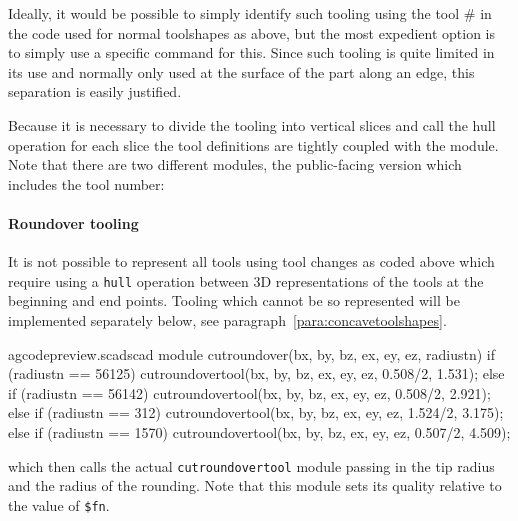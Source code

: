 \documentclass{ltxdoc}
\begin{document}
Ideally, it would be possible to simply identify such tooling using the tool \# in the code used for normal toolshapes as above, but the most expedient option is to simply use a specific command for this. Since such tooling is quite limited in its use and normally only used at the surface of the part along an edge, this separation is easily justified.

Because it is necessary to divide the tooling into vertical slices and call the hull operation for each slice the tool definitions are tightly coupled with the module. Note that there are two different modules, the public-facing version which includes the tool number:

\paragraph{Roundover tooling}

\label{para:roundover} It is not possible to represent all tools using tool changes as coded above which require using a \texttt{hull} operation between 3D representations of the tools at the beginning and end points. Tooling which cannot be so represented will be implemented separately below, see paragraph~\ref{para:concavetoolshapes}.

\lstset{firstnumber=\thegcpscad}
\begin{writecode}{a}{gcodepreview.scad}{scad}
module cutroundover(bx, by, bz, ex, ey, ez, radiustn) {
    if (radiustn == 56125) {
        cutroundovertool(bx, by, bz, ex, ey, ez, 0.508/2, 1.531);
    } else if (radiustn == 56142) {
        cutroundovertool(bx, by, bz, ex, ey, ez, 0.508/2, 2.921);
    } else if (radiustn == 312) {
        cutroundovertool(bx, by, bz, ex, ey, ez, 1.524/2, 3.175);
    } else if (radiustn == 1570) {
        cutroundovertool(bx, by, bz, ex, ey, ez, 0.507/2, 4.509);
    }
}

\end{writecode}
\addtocounter{gcpscad}{12}

\noindent which then calls the actual \texttt{cutroundovertool} module passing in the tip radius and the radius of the rounding. Note that this module sets its quality relative to the value of \verb|$fn|.

%
%
\end{document}
